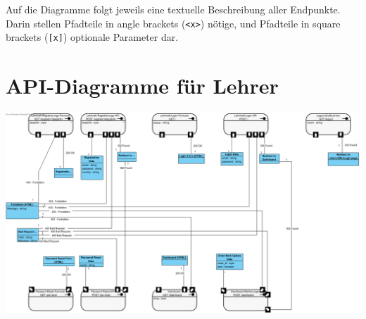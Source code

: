 Auf die Diagramme folgt jeweils eine textuelle Beschreibung aller Endpunkte. \\
Darin stellen Pfadteile in angle brackets (\texttt{<x>}) nötige, und Pfadteile in square brackets (\texttt{[x]}) optionale Parameter dar.\\

\section{API-Diagramme für Lehrer}
\includegraphics[width=\textwidth]{img/api-lehrkraft-login}
